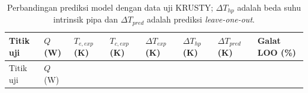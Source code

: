 \documentclass[
  indonesian,
  12pt,
  a4paper,
]{report}
\begin{document}
\begin{longtable}[]{@{}
  >{\centering\arraybackslash}p{}
  >{\centering\arraybackslash}p{}
  >{\centering\arraybackslash}p{}
  >{\centering\arraybackslash}p{}
  >{\centering\arraybackslash}p{}
  >{\centering\arraybackslash}p{}
  >{\centering\arraybackslash}p{}
  >{\centering\arraybackslash}p{}@{}}
\caption{Perbandingan prediksi model dengan data uji KRUSTY;
\(\Delta T_{hp}\) adalah beda suhu intrinsik pipa dan
\(\Delta T_{pred}\) adalah prediksi
\emph{leave-one-out}.}\label{tbl-krusty}\tabularnewline
\toprule\noalign{}
\begin{minipage}[b]{\linewidth}\centering
Titik uji
\end{minipage} & \begin{minipage}[b]{\linewidth}\centering
\(Q\) (W)
\end{minipage} & \begin{minipage}[b]{\linewidth}\centering
\(T_{e,exp}\) (K)
\end{minipage} & \begin{minipage}[b]{\linewidth}\centering
\(T_{c,exp}\) (K)
\end{minipage} & \begin{minipage}[b]{\linewidth}\centering
\(\Delta T_{exp}\) (K)
\end{minipage} & \begin{minipage}[b]{\linewidth}\centering
\(\Delta T_{hp}\) (K)
\end{minipage} & \begin{minipage}[b]{\linewidth}\centering
\(\Delta T_{pred}\) (K)
\end{minipage} & \begin{minipage}[b]{\linewidth}\centering
Galat LOO (\%)
\end{minipage} \\
\midrule\noalign{}
\endfirsthead
\toprule\noalign{}
\begin{minipage}[b]{\linewidth}\centering
Titik uji
\end{minipage} & \begin{minipage}[b]{\linewidth}\centering
\(Q\) (W)
\end{minipage} & \begin{minipage}[b]{\linewidth}\centering

\end{minipage}
\end{longtable}
\end{document}
